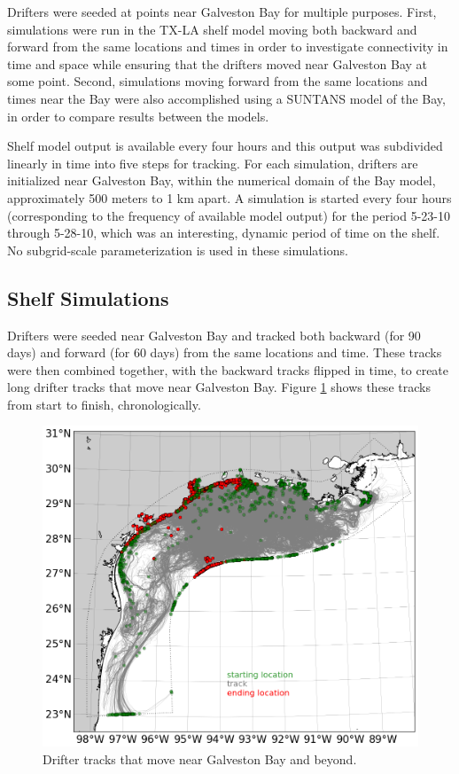 \documentclass[11pt]{article}
\begin{document}
Drifters were seeded at points near Galveston Bay for multiple purposes. First, simulations were run in the TX-LA shelf model moving both backward and forward from the same locations and times in order to investigate connectivity in time and space while ensuring that the drifters moved near Galveston Bay at some point. Second, simulations moving forward from the same locations and times near the Bay were also accomplished using a SUNTANS model of the Bay, in order to compare results between the models.

Shelf model output is available every four hours and this output was subdivided linearly in time into five steps for tracking. For each simulation, drifters are initialized near Galveston Bay, within the numerical domain of the Bay model, approximately 500 meters to 1 km apart. A simulation is started every four hours (corresponding to the frequency of available model output) for the period 5-23-10 through 5-28-10, which was an interesting, dynamic period of time on the shelf. No subgrid-scale parameterization is used in these simulations.

\subsection{Shelf Simulations}

Drifters were seeded near Galveston Bay and tracked both backward (for 90 days) and forward (for 60 days) from the same locations and time. These tracks were then combined together, with the backward tracks flipped in time, to create long drifter tracks that move near Galveston Bay. Figure \ref{fig:shelftracks} shows these tracks from start to finish, chronologically.

\begin{figure}
    \centering
    \includegraphics[width=\textwidth]{figures/matt/shelftracks.png}
    \caption{Drifter tracks that move near Galveston Bay and beyond.}
    \label{fig:shelftracks}
\end{figure}
\end{document}
